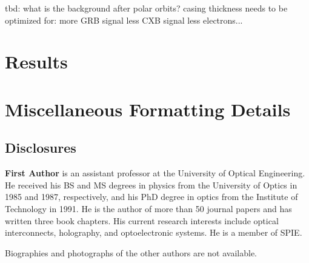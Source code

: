 \documentclass[12pt]{spieman}  %
\begin{document}
\begin{spacing}{2}
tbd: what is the background after polar orbits?
casing thickness needs to be optimized for:
more GRB signal
less CXB signal
less electrons...

\section{Results}



\appendix    %

\section{Miscellaneous Formatting Details}
\label{sect:misc}


\subsection*{Disclosures}


\acknowledgments 





\vspace{2ex}\noindent\textbf{First Author} is an assistant professor at the University of Optical Engineering. He received his BS and MS degrees in physics from the University of Optics in 1985 and 1987, respectively, and his PhD degree in optics from the Institute of Technology in 1991.  He is the author of more than 50 journal papers and has written three book chapters. His current research interests include optical interconnects, holography, and optoelectronic systems. He is a member of SPIE.

\vspace{1ex}
\noindent Biographies and photographs of the other authors are not available.

\listoffigures
\listoftables

\end{spacing}
\end{document}
